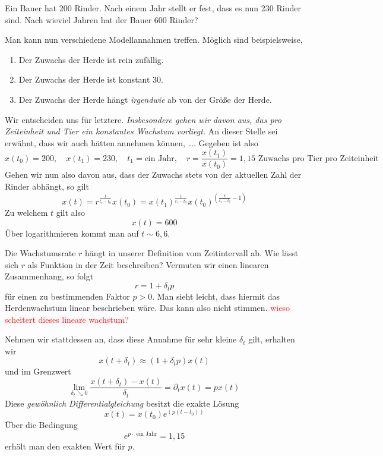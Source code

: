 Ein Bauer hat 200 Rinder. Nach einem Jahr stellt er fest, dass es nun 230 Rinder sind. Nach wieviel Jahren hat der Bauer 600 Rinder? \newline 

Man kann nun verschiedene Modellannahmen treffen. Möglich sind beispielsweise,
\begin{enumerate}
	\item Der Zuwachs der Herde ist rein zufällig.
	\item Der Zuwachs der Herde ist konstant 30.
	\item Der Zuwachs der Herde hängt \textit{irgendwie} ab von der Größe der Herde.
\end{enumerate}
Wir entscheiden uns für letztere. \textit{Insbesondere gehen wir davon aus, das pro Zeiteinheit und Tier ein konstantes Wachstum vorliegt.} An dieser Stelle sei erwähnt, dass wir auch hätten annehmen können, \dots. Gegeben ist also
\begin{equation*}
	x(t_0) = 200, \quad x(t_1) = 230, \quad t_1 = \text{ein Jahr}, \quad r=\frac{x(t_1)}{x(t_0)} = 1,15 \text{ Zuwachs pro Tier pro Zeiteinheit}
\end{equation*}
Gehen wir nun also davon aus, dass der Zuwachs stets von der aktuellen Zahl der Rinder abhängt, so gilt
\begin{equation*}
	x(t) = r^{\frac{t}{t_1-t_0}} x(t_0) = x(t_1)^{\frac{t}{t_1-t_0}} x(t_0)^{( \frac{t}{t_1 - t_0} - 1)}
\end{equation*}
Zu welchem $t$ gilt also
\begin{equation*}
	x(t) = 600
\end{equation*}
Über logarithmieren kommt man auf $t \sim 6,6$. \newline 

Die Wachstumsrate $r$ hängt in unserer Definition vom Zeitintervall ab. Wie lässt sich $r$ als Funktion in der Zeit beschreiben? Vermuten wir einen linearen Zusammenhang, so folgt
\begin{equation*}
	r = 1 + \delta_t p
\end{equation*}
für einen zu bestimmenden Faktor $p>0$. Man sieht leicht, dass hiermit das Herdenwachstum linear beschrieben wäre. Das kann also nicht stimmen.
\textcolor{red}{wieso scheitert dieses lineare wachstum?}

Nehmen wir stattdessen an, dass diese Annahme für sehr kleine $\delta_t$ gilt, erhalten wir 
\begin{equation*}
	x(t + \delta_t) \approx (1+ \delta_t p) x(t)
\end{equation*}
und im Grenzwert
\begin{equation*}
	\lim_{\delta_t \searrow 0} \frac{x(t + \delta_t) - x(t)}{\delta_t}= \partial_t x(t) = p x(t)
\end{equation*}
Diese \textit{gewöhnlich Differentialgleichung} besitzt die exakte Lösung
\begin{equation*}
	x(t) = x(t_0) e^{(p(t - t_0))}
\end{equation*}
Über die Bedingung
\begin{equation*}
	e^{p \cdot \text{ ein Jahr}} = 1,15
\end{equation*}
erhält man den exakten Wert für $p$.


